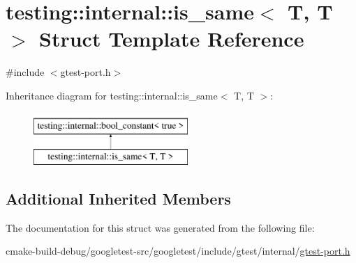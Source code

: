 \hypertarget{structtesting_1_1internal_1_1is__same_3_01T_00_01T_01_4}{}\section{testing\+::internal\+::is\+\_\+same$<$ T, T $>$ Struct Template Reference}
\label{structtesting_1_1internal_1_1is__same_3_01T_00_01T_01_4}


{\ttfamily \#include $<$gtest-\/port.\+h$>$}

Inheritance diagram for testing\+::internal\+::is\+\_\+same$<$ T, T $>$\+:\begin{figure}[H]
\begin{center}
\leavevmode
\includegraphics[height=2.000000cm]{structtesting_1_1internal_1_1is__same_3_01T_00_01T_01_4}
\end{center}
\end{figure}
\subsection*{Additional Inherited Members}


The documentation for this struct was generated from the following file\+:\begin{DoxyCompactItemize}
\item 
cmake-\/build-\/debug/googletest-\/src/googletest/include/gtest/internal/\mbox{\hyperlink{gtest-port_8h}{gtest-\/port.\+h}}\end{DoxyCompactItemize}

